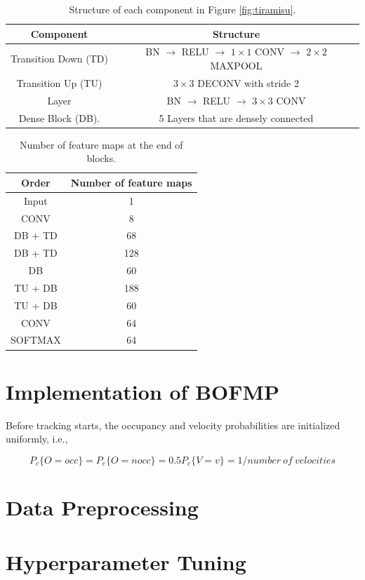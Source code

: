 \begin{table}[H]
\centering  
\begin{tabularx}{.9\textwidth}{c|c}
    \hline
    Component            & Structure            \\ \hline \hline
    Transition Down (TD) & BN $\rightarrow$ RELU $\rightarrow$ $1 \times 1$ CONV $\rightarrow$ $2 \times 2$ MAXPOOL \\ \hline
    Transition Up (TU)   & $3 \times 3$ DECONV with stride 2 \\
   \hline
   Layer                 & BN $\rightarrow$ RELU $\rightarrow$ $3 \times 3$ CONV \\ \hline
   Dense Block (DB).     & 5 Layers that are densely connected \\ \hline
  \end{tabularx}
\caption{Structure of each component in Figure \ref{fig:tiramisu}.}
\label{table:components}
\end{table}

\begin{table}[H]
\centering  
\begin{tabularx}{.45\textwidth}{c|c}
    \hline
    Order            & Number of feature maps            \\ \hline \hline
    Input                &    1 \\ \hline
    CONV                 &    8 \\ \hline
    DB + TD              &    68 \\ \hline
    DB + TD              &    128 \\ \hline
    DB                   &    60 \\ \hline
    TU + DB              &    188 \\ \hline
    TU + DB              &    60 \\ \hline
    CONV                 &    64 \\ \hline
    SOFTMAX              &    64 \\ \hline
  \end{tabularx}
\caption{Number of feature maps at the end of blocks.}
\label{table:number_feature_maps}
\end{table}

\section{Implementation of BOFMP} \label{sec:BOFMP_implementation}

Before tracking starts, the occupancy and velocity probabilities are initialized uniformly, i.e.,

\[ P_c\{ O = occ \}=P_c\{O = nocc\}=0.5  P_c\{V= v \}=1/number \ of \ velocities \] 

\section{Data Preprocessing}

\section{Hyperparameter Tuning} \label{sec:hyperparameter}

